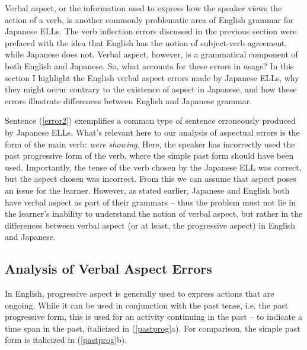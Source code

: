 \documentclass{article}
\begin{document}
Verbal aspect, or the information used to express how the speaker views the action of a verb, is another commonly problematic area of English grammar for Japanese ELLs. The verb inflection errors discussed in the previous section were prefaced with the idea that English has the notion of subject-verb agreement, while Japanese does not. Verbal aspect, however, is a grammatical component of both English and Japanese. So, what accounts for these errors in usage? In this section I highlight the English verbal aspect errors made by Japanese ELLs, why they might occur contrary to the existence of aspect in Japanese, and how these errors illustrate differences between English and Japanese grammar.
\begin{exe}
	\label{error2}
\end{exe}
Sentence (\ref{error2}) \citep{Bryant1984} exemplifies a common type of sentence erroneously produced by Japanese ELLs. What’s relevant here to our analysis of aspectual errors is the form of the main verb: \textit{were showing}. Here, the speaker has incorrectly used the past progressive form of the verb, where the simple past form should have been used. Importantly, the tense of the verb chosen by the Japanese ELL was correct, but the aspect chosen was incorrect. From this we can assume that aspect poses an issue for the learner. However, as stated earlier, Japanese and English both have verbal aspect as part of their grammars – thus the problem must not lie in the learner’s inability to understand the notion of verbal aspect, but rather in the differences between verbal aspect (or at least, the progressive aspect) in English and Japanese.

\newpage

\subsection{Analysis of Verbal Aspect Errors}

In English, progressive aspect is generally used to express actions that are ongoing. While it can be used in conjunction with the past tense, i.e. the past progressive form, this is used for an activity continuing in the past – to indicate a time span in the past, italicized in (\ref{pastprog}a). For comparison, the simple past form is italicized in (\ref{pastprog}b).
\end{document}
